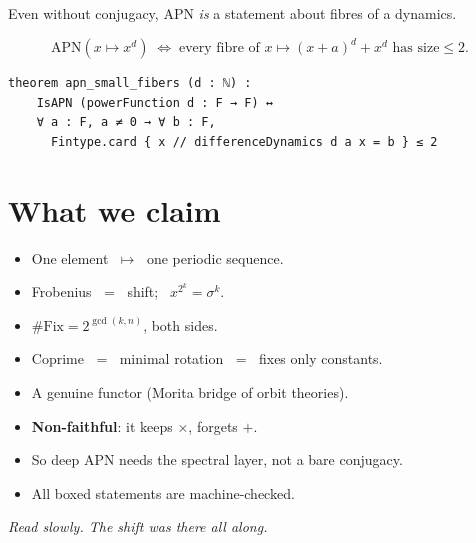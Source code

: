 \documentclass[11pt]{article}
\begin{document}
\bigskip

Even without conjugacy, APN \emph{is} a statement about fibres of a dynamics.

\bigskip

\[
  \text{APN}(x \mapsto x^{d})
  \;\Longleftrightarrow\;
  \text{every fibre of } x \mapsto (x+a)^{d} + x^{d} \text{ has size} \le 2 .
\]

\begin{lstlisting}
theorem apn_small_fibers (d : ℕ) :
    IsAPN (powerFunction d : F → F) ↔
    ∀ a : F, a ≠ 0 → ∀ b : F,
      Fintype.card { x // differenceDynamics d a x = b } ≤ 2
\end{lstlisting}

\bigskip


\newpage


\section{What we claim}

\bigskip

\begin{itemize}
  \item One element $\;\mapsto\;$ one periodic sequence.\\[6pt]
  \item Frobenius $\;=\;$ shift; \ $x^{2^{k}} = \sigma^{k}$.\\[6pt]
  \item $\#\mathrm{Fix} = 2^{\gcd(k,n)}$, both sides.\\[6pt]
  \item Coprime $\;=\;$ minimal rotation $\;=\;$ fixes only constants.\\[6pt]
  \item A genuine functor (Morita bridge of orbit theories).\\[6pt]
  \item \textbf{Non-faithful}: it keeps $\times$, forgets $+$.\\[6pt]
  \item So deep APN needs the spectral layer, not a bare conjugacy.\\[6pt]
  \item All boxed statements are machine-checked.
\end{itemize}

\vfill

\noindent\textit{Read slowly. The shift was there all along.}
\end{document}
